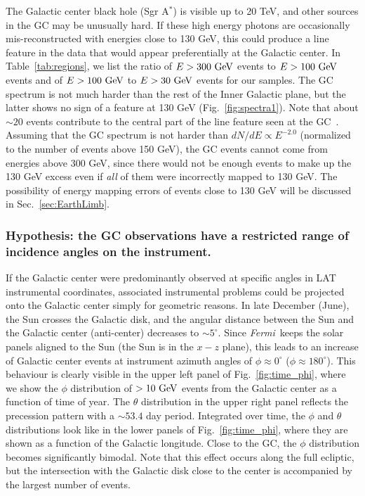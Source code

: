 \documentclass[aps,twocolumn,prd,superscriptaddress,showpacs,nofootinbib,fixfloat]{revtex4}
\newcommand{\Fermi}{{\slshape Fermi}}
\newcommand{\GeV}{{\rm ~GeV}}
\begin{document}
The Galactic center black hole (Sgr A$^*$) is visible up to 20 
TeV, and other
sources in the GC may be unusually hard. If these high energy
photons are occasionally mis-reconstructed with energies
close to 130 GeV, this could produce a line feature in the
data that would appear preferentially at the Galactic center.
In Table~\ref{tab:regions}, we list the ratio of $E>300\GeV$
events to $E>100\GeV$ events and of $E>100\GeV$ to $E>30\GeV$
events for our samples.  The
GC spectrum is not much harder than the rest of the Inner Galactic
plane, but the latter shows no sign of a feature at 130 GeV
(Fig.~\ref{fig:spectra1}). Note that
about $\sim20$ events contribute to the central part of the
line feature seen at the GC~\citep{linepaper}. 
Assuming that the GC spectrum is not
harder than $dN/dE \propto E^{-2.0}$ (normalized to the
number of events above 150 GeV), the GC events cannot come
from energies above 300 GeV, since there would not be enough
events to make up the 130 GeV excess even if \emph{all} of
them were incorrectly mapped to 130 GeV. The possibility of energy
mapping errors of events close to 130 GeV will be discussed
in Sec.~\ref{sec:EarthLimb}.

\subsubsection{Hypothesis: the GC observations have a
restricted range of incidence angles on the instrument.}

If the Galactic center were predominantly observed at
specific angles in LAT instrumental coordinates, associated
instrumental problems could be projected onto the Galactic
center simply for geometric reasons. 
In late December (June), the Sun crosses the Galactic disk,
and the angular
distance between the Sun and the Galactic center
(anti-center) decreases to $\sim5^\circ$. Since \Fermi\ keeps
the solar panels aligned to the Sun (the Sun is in the $x-z$ plane), this
leads to an
increase of Galactic center events at instrument azimuth
angles of $\phi\approx 0^\circ$ ($\phi\approx 180^\circ$).
This behaviour is clearly visible in the upper left panel of
Fig.~\ref{fig:time_phi}, where we show the $\phi$
distribution of $>10\GeV$ events from the Galactic center as
a function of time of year.  The $\theta$
distribution in the upper right panel reflects the
precession pattern with a $\sim53.4$ day period. Integrated
over time, the $\phi$ and $\theta$ distributions look like
in the lower panels of Fig.~\ref{fig:time_phi}, where they
are shown as a function of the Galactic longitude. Close to
the GC, the $\phi$ distribution becomes significantly
bimodal. Note that this effect occurs along the full 
ecliptic,
but the intersection with the Galactic disk
close to the center is accompanied by the largest number of
events.
\end{document}
